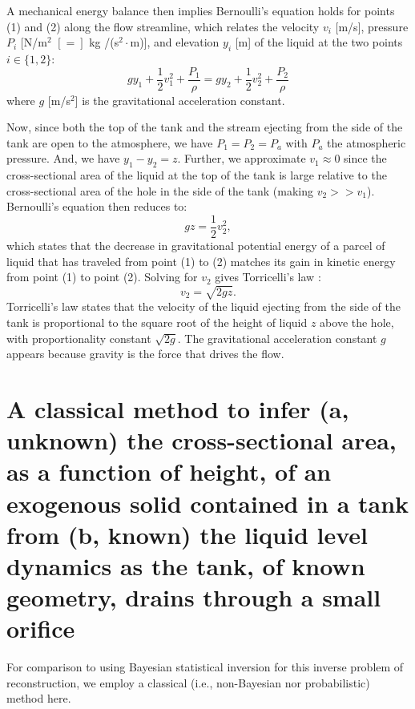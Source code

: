 \documentclass[a4paper,fleqn]{cas-sc}
\begin{document}
	A mechanical energy balance then implies Bernoulli's equation \cite{welty2020fundamentals} holds for points (1) and (2) along the flow streamline, which relates the velocity $v_i$ [m/s], pressure $P_i$ [N/m$^2$ $[=]$ kg /(s$^2\cdot$m)], and elevation $y_i$ [m] of the liquid at the two points $i\in\{1,2\}$:
	\begin{equation}
	g y_1 + \frac{1}{2} v_1^2 + \frac{P_1}{\rho} = gy_2 + \frac{1}{2} v_2^2 + \frac{P_2}{\rho} 
	\end{equation}
	where $g$ [m/s$^2$] is the gravitational acceleration constant. 
	
	Now, since both the top of the tank and the stream ejecting from the side of the tank are open to the atmosphere, we have $P_1=P_2=P_a$ with $P_a$ the atmospheric pressure. And, we have $y_1-y_2=z$. Further, we approximate $v_1\approx 0$ since the cross-sectional area of the liquid at the top of the tank is large relative to the cross-sectional area of the hole in the side of the tank (making $v_2 >> v_1$). Bernoulli's equation then reduces to:
	\begin{equation}
	g z  = \frac{1}{2} v_2^2,
	\end{equation}
	which states that the decrease in gravitational potential energy of a parcel of liquid that has traveled from point (1) to (2) matches its gain in kinetic energy from point (1) to point (2). Solving for $v_2$ gives Torricelli's law \cite{driver1998torricelli}:
	\begin{equation}
	v_2 = \sqrt{2gz}.
	\end{equation}
	Torricelli's law states that the velocity of the liquid ejecting from the side of the tank is proportional to the square root of the height of liquid $z$ above the hole, with proportionality constant $\sqrt{2g}$. The gravitational acceleration constant $g$ appears because gravity is the force that drives the flow.
	
\clearpage
	
\section{
A classical method 
to infer 
(a, unknown) the cross-sectional area, as a function of height, of an exogenous solid contained in a tank from 
(b, known) the liquid level dynamics as the tank, of known geometry, drains through a small orifice
}
For comparison to using Bayesian statistical inversion for this inverse problem of reconstruction, we employ a classical (i.e., non-Bayesian nor probabilistic) method here.
\end{document}
